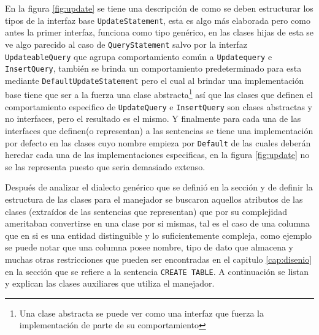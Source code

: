 En la figura \ref{fig:update} se tiene una descripción de como se deben estructurar los tipos de la interfaz base \verb=UpdateStatement=, esta es algo más elaborada pero como antes la primer interfaz, funciona como tipo genérico, en las clases hijas de esta se ve algo parecido al caso de \verb=QueryStatement= salvo por la interfaz \verb=UpdateableQuery= que agrupa comportamiento común a \verb=Updatequery= e \verb=InsertQuery=, también se brinda un comportamiento predeterminado para esta mediante \verb=DefaultUpdateStatement= pero el cual al brindar una implementación base tiene que ser a la fuerza una clase abstracta\footnote{Una clase abstracta se puede ver como una interfaz que fuerza la implementación de parte de su comportamiento} así que las clases que definen el comportamiento especifico de \verb=UpdateQuery= e \verb=InsertQuery= son clases abstractas y no interfaces, pero el resultado es el mismo. Y finalmente para cada una de las interfaces que definen(o representan) a las sentencias se tiene una implementación por defecto en las clases cuyo nombre empieza por \verb=Default= de las cuales deberán heredar cada una de las implementaciones especificas, en la figura \ref{fig:update} no se las representa puesto que seria demasiado extenso.

Después de analizar el dialecto genérico que se definió en la sección  y de definir la estructura de las clases para el manejador se buscaron aquellos atributos de las clases (extraídos de las sentencias que representan) que por su complejidad ameritaban convertirse en una clase por si mismas, tal es el caso de una columna que en si es una entidad distinguible y lo suficientemente compleja, como ejemplo se puede notar que una columna posee nombre, tipo de dato que almacena y muchas otras restricciones que pueden ser encontradas en el capitulo \ref{cap:disenio} en la sección que se refiere a la sentencia \verb=CREATE TABLE=. A continuación se listan y explican las clases auxiliares que utiliza el manejador. 
%
